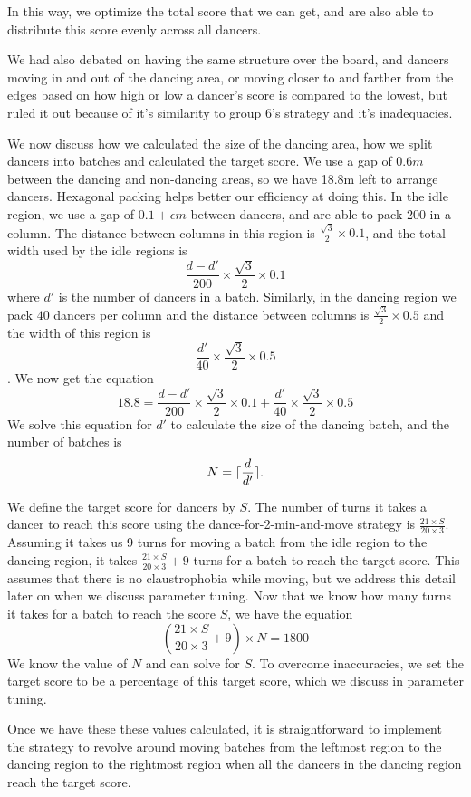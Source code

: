 \documentclass[a4paper,11pt,titlepage]{article}
\DeclarePairedDelimiter{\ceil}{\lceil}{\rceil}
\begin{document}
In this way, we optimize the total score that we can get, and are also able to distribute this score evenly across all dancers.

We had also debated on having the same structure over the board, and dancers moving in and out of the dancing area, or moving closer to and farther from the edges based on how high or low a dancer's score is compared to the lowest, but ruled it out because of it's similarity to group 6's strategy and it's inadequacies.

We now discuss how we calculated the size of the dancing area, how we split dancers into batches and calculated the target score. We use a gap of $0.6m$ between the dancing and non-dancing areas, so we have 18.8m left to arrange dancers. Hexagonal packing helps better our efficiency at doing this. In the idle region, we use a gap of $0.1 + \epsilon m$ between dancers, and are able to pack 200 in a column. The distance between columns in this region is $\frac{\sqrt{3}}{2} \times 0.1$, and the total width used by the idle regions is $$\frac{d-d'}{200} \times \frac{\sqrt{3}}{2} \times 0.1$$ where $d'$ is the number of dancers in a batch. Similarly, in the dancing region we pack $40$ dancers per column and the distance between columns is $\frac{\sqrt{3}}{2} \times 0.5$ and the width of this region is $$\frac{d'}{40} \times \frac{\sqrt{3}}{2} \times 0.5$$. We now get the equation $$ 18.8 = \frac{d-d'}{200} \times \frac{\sqrt{3}}{2} \times 0.1 + \frac{d'}{40} \times \frac{\sqrt{3}}{2} \times 0.5$$ We solve this equation for $d'$ to calculate the size of the dancing batch, and the number of batches is $$N = \ceil{\frac{d}{d'}}.$$

We define the target score for dancers by $S$. The number of turns it takes a dancer to reach this score using the dance-for-2-min-and-move strategy is $\frac{21 \times S}{20 \times 3}$. Assuming it takes us 9 turns for moving a batch from the idle region to the dancing region, it takes $\frac{21 \times S}{20 \times 3} + 9$ turns for a batch to reach the target score. This assumes that there is no claustrophobia while moving, but we address this detail later on when we discuss parameter tuning. Now that we know how many turns it takes for a batch to reach the score $S$, we have the equation $$ \left( \frac{21 \times S}{20 \times 3} + 9\right) \times N = 1800 $$ We know the value of $N$ and can solve for $S$. To overcome inaccuracies, we set the target score to be a percentage of this target score, which we discuss in parameter tuning.

Once we have these these values calculated, it is straightforward to implement the strategy to revolve around moving batches from the leftmost region to the dancing region to the rightmost region when all the dancers in the dancing region reach the target score.
\end{document}
